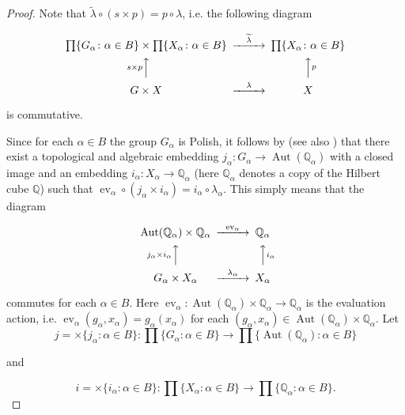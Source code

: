 \documentclass[12pt,draft]{amsart}
\theoremstyle{plain}
\theoremstyle{definition}
\numberwithin{equation}{section}
\begin{document}
\begin{proof}
\noindent Note that
$\widetilde{\lambda}\circ (s\times p) = p \circ \lambda$,
i.e. the following diagram

\[
\begin{CD}
\prod\{ G_{\alpha} \colon \alpha \in B\} \times
\prod\{ X_{\alpha} \colon \alpha \in B\} @>\widetilde{\lambda}>>
\prod\{ X_{\alpha} \colon \alpha \in B\}\\
@A{s\times p}AA @AA{p}A\\
G\times X @>\lambda>> X
\end{CD}
\]

\noindent is commutative.

Since for each $\alpha \in B$ the group $G_{\alpha}$ is Polish, it follows
by \cite{megr96} (see also \cite[Theorem 2.6.7]{bekech96}) that
there exist a
topological and algebraic embedding $j_{\alpha} \colon G_{\alpha} \to \operatorname{Aut}({\mathbb Q}_{\alpha})$
with a closed image and an embedding
$i_{\alpha} \colon X_{\alpha} \to {\mathbb Q}_{\alpha}$
(here ${\mathbb Q}_{\alpha}$ denotes a copy of the
Hilbert cube ${\mathbb Q}$) such that
$\operatorname{ev}_{\alpha} \circ (j_{\alpha}
\times i_{\alpha}) = i_{\alpha} \circ \lambda_{\alpha}$.
This simply means that the diagram

\[
\begin{CD}
\operatorname{Aut}({\mathbb Q}_{\alpha}) \times
{\mathbb Q}_{\alpha} @>\operatorname{ev}_{\alpha}>>
{\mathbb Q}_{\alpha}\\
@A{j_{\alpha}\times i_{\alpha}}AA @AA{i_{\alpha}}A\\
G_{\alpha}\times X_{\alpha} @>\lambda_{\alpha}>> X_{\alpha}
\end{CD}
\]
\medskip

\noindent commutes for each $\alpha \in B$. Here $\operatorname{ev}_{\alpha}
\colon \operatorname{Aut}({\mathbb Q}_{\alpha}) \times
{\mathbb Q}_{\alpha} \to {\mathbb Q}_{\alpha}$ is the evaluation action, i.e.
$\operatorname{ev}_{\alpha}(g_{\alpha}, x_{\alpha}) = g_{\alpha}(x_{\alpha})$ for each $(g_{\alpha}, x_{\alpha}) \in \operatorname{Aut}({\mathbb Q}_{\alpha}) \times
{\mathbb Q}_{\alpha}$. Let 
\[ j  = \times \{ j_{\alpha} \colon \alpha \in B \} \colon
\prod\{ G_{\alpha} \colon \alpha \in B\} \to
\prod\{ \operatorname{Aut}({\mathbb Q}_{\alpha}) \colon \alpha \in B\} \]

\noindent and

\[ i = \times\{ i_{\alpha} \colon \alpha \in B\} \colon
\prod\{ X_{\alpha} \colon \alpha \in B\} \to \prod\{
{\mathbb Q}_{\alpha} \colon \alpha \in B\} .\]


\end{proof}
\end{document}
